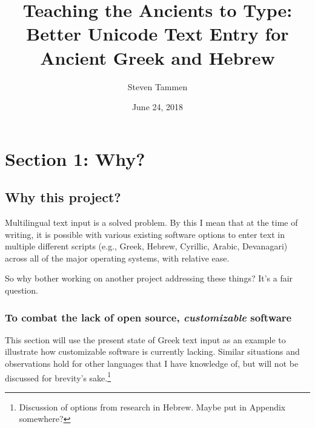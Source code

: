 \documentclass[11pt]{article}
\author{Steven Tammen}
\date{June 24, 2018}
\title{Teaching the Ancients to Type: Better Unicode Text Entry for Ancient Greek and Hebrew}
\begin{document}
\maketitle
\setcounter{tocdepth}{2}
\tableofcontents



\section{Section 1: Why?}
\label{sec:org1179eb0}

\subsection{Why this project?}
\label{sec:org6908ef2}

Multilingual text input is a solved problem. By this I mean that at the time of writing, it is possible with various existing software options to enter text in multiple different scripts (e.g., Greek, Hebrew, Cyrillic, Arabic, Devanagari) across all of the major operating systems, with relative ease.

So why bother working on another project addressing these things? It's a fair question.

\subsubsection{To combat the lack of open source, \emph{customizable} software}
\label{sec:org3fdd7a8}

This section will use the present state of Greek text input as an example to illustrate how customizable software is currently lacking. Similar situations and observations hold for other languages that I have knowledge of, but will not be discussed for brevity's sake.\footnote{Discussion of options from research in Hebrew. Maybe put in Appendix somewhere?}
\end{document}
